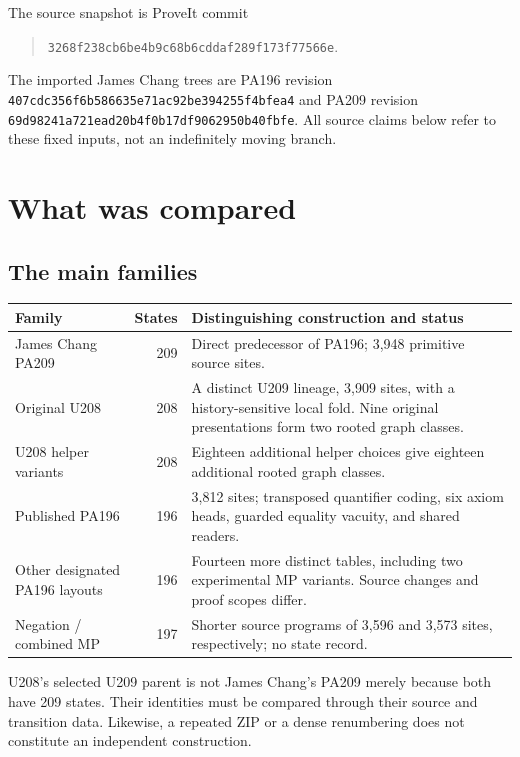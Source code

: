 \documentclass[11pt,letterpaper]{article}
\newcommand{\file}[1]{\texttt{\nolinkurl{#1}}}
\begin{document}
The source snapshot is ProveIt commit
\begin{quote}\small\nolinkurl{3268f238cb6be4b9c68b6cddaf289f173f77566e}.\end{quote}
The imported James Chang trees are PA196 revision
\file{407cdc356f6b586635e71ac92be394255f4bfea4} and PA209 revision
\file{69d98241a721ead20b4f0b17df9062950b40fbfe}. All source claims below
refer to these fixed inputs, not an indefinitely moving branch.

\section{What was compared}

\subsection{The main families}

\begin{center}
\small
\begin{tabular}{@{}p{1.25in}rp{3.95in}@{}}
\toprule
Family & States & Distinguishing construction and status\\
\midrule
James Chang PA209 & 209 & Direct predecessor of PA196; 3,948 primitive source sites.\\
Original U208 & 208 & A distinct U209 lineage, 3,909 sites, with a history-sensitive local fold. Nine original presentations form two rooted graph classes.\\
U208 helper variants & 208 & Eighteen additional helper choices give eighteen additional rooted graph classes.\\
Published PA196 & 196 & 3,812 sites; transposed quantifier coding, six axiom heads, guarded equality vacuity, and shared readers.\\
Other designated PA196 layouts & 196 & Fourteen more distinct tables, including two experimental MP variants. Source changes and proof scopes differ.\\
Negation / combined MP & 197 & Shorter source programs of 3,596 and 3,573 sites, respectively; no state record.\\
\bottomrule
\end{tabular}
\end{center}

U208's selected U209 parent is not James Chang's PA209 merely because both
have 209 states. Their identities must be compared through their source and
transition data. Likewise, a repeated ZIP or a dense renumbering does not
constitute an independent construction.
\end{document}
